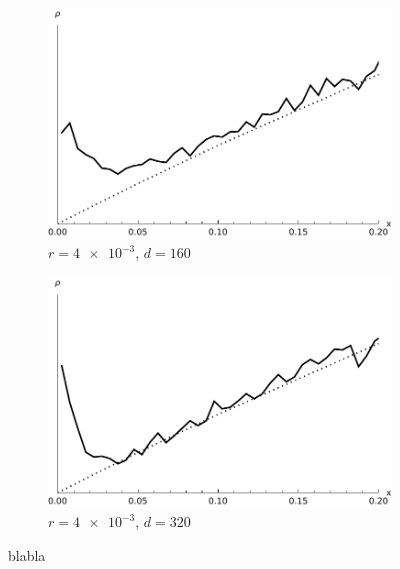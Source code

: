 \documentclass[a4paper,12pt,reqno,superscriptaddress,nofootinbib]{article}
\theoremstyle{plain}
\theoremstyle{definition}
\theoremstyle{remark}
\newcommand{\0}{^{(0)}}
\newcommand{\1}{^{(1)}}
\newcommand{\2}{^{(2)}}
\begin{document}
\begin{figure}
	\begin{subfigure}{0.48\textwidth}
		\includegraphics[width=\textwidth]{plot-r-3-d-4.pdf}
		\caption{$r=\num{4e-3}$, $d=160$}
	\end{subfigure}\hfill
	\begin{subfigure}{0.48\textwidth}
		\includegraphics[width=\textwidth]{plot-r-3-d-5.pdf}
		\caption{$r=\num{4e-3}$, $d=320$}
	\end{subfigure}
	\caption{blabla}\label{fig:gridplot}
\end{figure}
\end{document}
